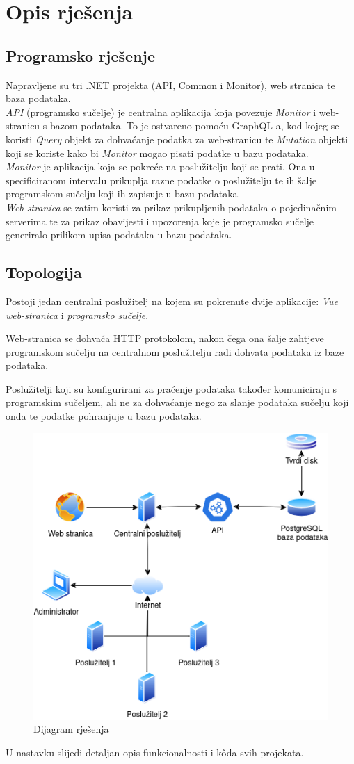 \documentclass[zavrsnirad]{fer}
\begin{document}
\chapter{Opis rješenja}
\label{pog:opis_rjesenja}
\section{Programsko rješenje}
Napravljene su tri .NET projekta (API, Common i Monitor), web stranica te baza podataka.
\\\textit{API} (programsko sučelje) je centralna aplikacija koja povezuje \textit{Monitor} i web-stranicu s bazom podataka. To je ostvareno pomoću GraphQL-a, kod kojeg se koristi \textit{Query} objekt za dohvaćanje podatka za web-stranicu te \textit{Mutation} objekti koji se koriste kako bi \textit{Monitor} mogao pisati podatke u bazu podataka.
\\\textit{Monitor} je aplikacija koja se pokreće na poslužitelju koji se prati. Ona u specificiranom intervalu prikuplja razne podatke o poslužitelju te ih šalje programskom sučelju koji ih zapisuje u bazu podataka.
\\\textit{Web-stranica} se zatim koristi za prikaz prikupljenih podataka o pojedinačnim serverima te za prikaz obavijesti i upozorenja koje je programsko sučelje generiralo prilikom upisa podataka u bazu podataka.

\section{Topologija}
Postoji jedan centralni poslužitelj na kojem su pokrenute dvije aplikacije: \textit{Vue web-stranica} i \textit{programsko sučelje}.

Web-stranica se dohvaća HTTP protokolom, nakon čega ona šalje zahtjeve programskom sučelju na centralnom poslužitelju radi dohvata podataka iz baze podataka.

Poslužitelji koji su konfigurirani za praćenje podataka također komuniciraju s programskim sučeljem, ali ne za dohvaćanje nego za slanje podataka sučelju koji onda te podatke pohranjuje u bazu podataka.
\begin{figure}[htb!]
	\centering
	\includegraphics[width=0.6\linewidth]{images/flowchart.png} 
	\caption{Dijagram rješenja}
	\label{slk:flowchart}
\end{figure}
\FloatBarrier
U nastavku slijedi detaljan opis funkcionalnosti i kôda svih projekata.
\end{document}
